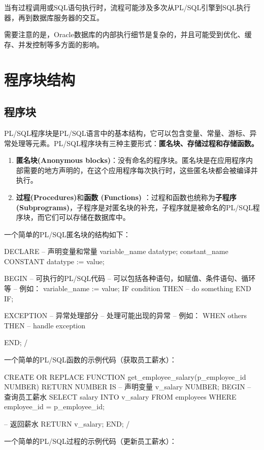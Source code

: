 \documentclass[11pt, a4paper, oneside, UTF8]{ctexbook}
\let\kaishu\relax %
\begin{document}
当有过程调用或SQL语句执行时，流程可能涉及多次从PL/SQL引擎到SQL执行器，再到数据库服务器的交互。

需要注意的是，Oracle数据库的内部执行细节是复杂的，并且可能受到优化、缓存、并发控制等多方面的影响。

\chapter{程序块结构}
\section{程序块}
PL/SQL程序块是PL/SQL语言中的基本结构，它可以包含变量、常量、游标、异常处理等元素。PL/SQL程序块有三种主要形式：{\bfseries\kaishu 匿名块、存储过程和存储函数。}

\begin{enumerate}
  \item {\bfseries\kaishu 匿名块(Anonymous blocks)}：没有命名的程序块。匿名块是在应用程序内部需要的地方声明的，在这个应用程序每次执行时，这些匿名块都会被编译并执行。
  \item  {\bfseries\kaishu 过程(Procedures)}和{\bfseries\kaishu 函数 (Functions) }：过程和函数也统称为{\bfseries\kaishu 子程序 (Subprograms)}，子程序是对匿名块的补充，子程序就是被命名的PL/SQL程序块，而它们可以存储在数据库中。
\end{enumerate}
一个简单的PL/SQL匿名块的结构如下：
\begin{plsql}[caption=PL/SQL匿名块示例代码]
DECLARE
  -- 声明变量和常量
  variable_name datatype;
  constant_name CONSTANT datatype := value;

BEGIN
  -- 可执行的PL/SQL代码
  -- 可以包括各种语句，如赋值、条件语句、循环等
  -- 例如：
  variable_name := value;
  IF condition THEN
  -- do something
  END IF;

EXCEPTION
  -- 异常处理部分
  -- 处理可能出现的异常
  -- 例如：
  WHEN others THEN
  -- handle exception

END;
/
\end{plsql}
一个简单的PL/SQL函数的示例代码（获取员工薪水）：
\begin{plsql}[caption=获取员工薪水函数示例代码]
CREATE OR REPLACE FUNCTION get_employee_salary(p_employee_id NUMBER)
  RETURN NUMBER
  IS
  -- 声明变量
  v_salary NUMBER;
BEGIN
  -- 查询员工薪水
  SELECT salary INTO v_salary
  FROM employees
  WHERE employee_id = p_employee_id;

  -- 返回薪水
  RETURN v_salary;
END;
/
\end{plsql}
一个简单的PL/SQL过程的示例代码（更新员工薪水）：
\end{document}
